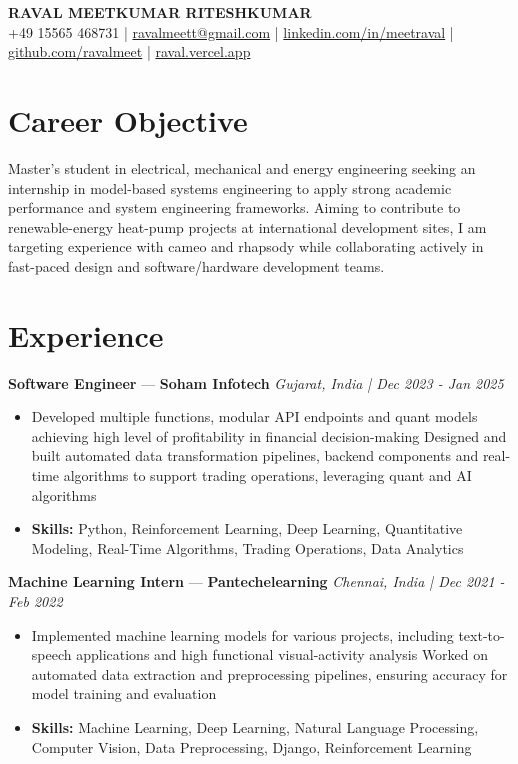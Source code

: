 \documentclass[a4paper,10pt]{article}
\begin{document}
\begin{center}
  {\Large\bfseries RAVAL MEETKUMAR RITESHKUMAR}\\[2pt]
  {\small +49 15565 468731 \;|\; \href{mailto:ravalmeett@gmail.com}{ravalmeett@gmail.com} \;|\; \href{https://www.linkedin.com/in/meetraval/}{linkedin.com/in/meetraval} \;|\; \href{https://github.com/ravalmeet}{github.com/ravalmeet} \;|\; \href{https://raval.vercel.app/}{raval.vercel.app}}
\end{center}
\vspace{-3pt}

\section*{Career Objective}
Master's student in electrical, mechanical and energy engineering seeking an internship in model-based systems engineering to apply strong academic performance and system engineering frameworks. Aiming to contribute to renewable-energy heat-pump projects at international development sites, I am targeting experience with cameo and rhapsody while collaborating actively in fast-paced design and software/hardware development teams.\par

\section*{Experience}
\textbf{Software Engineer} — \textbf{Soham Infotech} \hfill \textit{Gujarat, India \;|\; Dec 2023 - Jan 2025}\par
\vspace{1pt}
\begin{itemize}
  \item Developed multiple functions, modular API endpoints and quant models achieving high level of profitability in financial decision-making Designed and built automated data transformation pipelines, backend components and real-time algorithms to support trading operations, leveraging quant and AI algorithms
  \item \textbf{Skills:} Python, Reinforcement Learning, Deep Learning, Quantitative Modeling, Real-Time Algorithms, Trading Operations, Data Analytics
\end{itemize}
\vspace{3pt}
\textbf{Machine Learning Intern} — \textbf{Pantechelearning} \hfill \textit{Chennai, India \;|\; Dec 2021 - Feb 2022}\par
\vspace{1pt}
\begin{itemize}
  \item Implemented machine learning models for various projects, including text-to-speech applications and high functional visual-activity analysis Worked on automated data extraction and preprocessing pipelines, ensuring accuracy for model training and evaluation
  \item \textbf{Skills:} Machine Learning, Deep Learning, Natural Language Processing, Computer Vision, Data Preprocessing, Django, Reinforcement Learning
\end{itemize}
\end{document}
